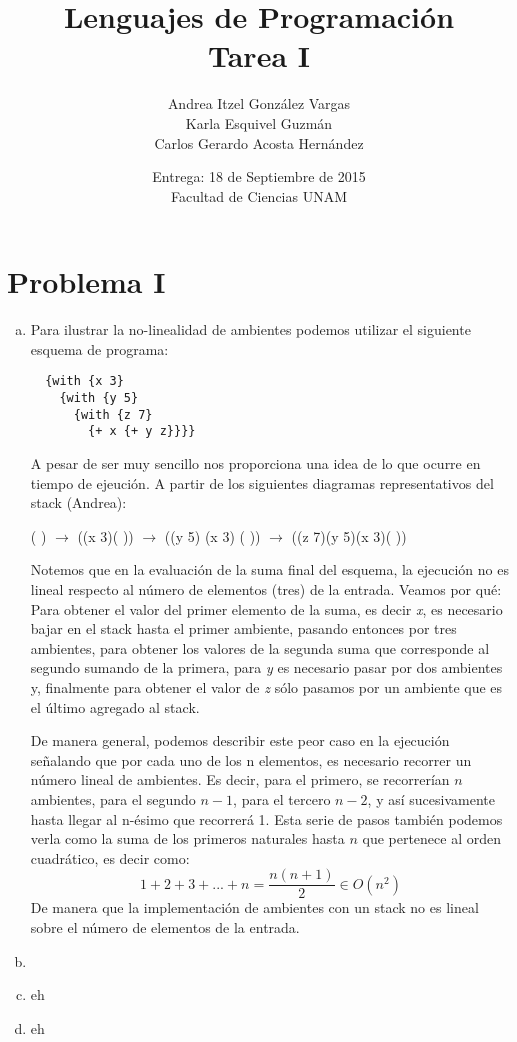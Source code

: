\documentclass[12pt]{article}
\title{Lenguajes de Programación \\ Tarea I}
\author{Andrea Itzel González Vargas \\ Karla Esquivel Guzmán \\ Carlos Gerardo Acosta Hernández}
\date{Entrega: 18 de Septiembre de 2015 \\ Facultad de Ciencias UNAM}
\begin{document}
\maketitle
\section{Problema I}
\begin{enumerate}[a)]
\item \indent Para ilustrar la no-linealidad de ambientes podemos utilizar el siguiente esquema de programa:
\begin{verbatim}
  {with {x 3}
    {with {y 5}
      {with {z 7}
        {+ x {+ y z}}}}
\end{verbatim}
A pesar de ser muy sencillo nos proporciona una idea de lo que ocurre en tiempo de ejeución. A partir de los siguientes diagramas representativos
del stack (Andrea):\par
( ) $\to$ ((x 3)( )) $\to$ ((y 5) (x 3) ( )) $\to$ ((z 7)(y 5)(x 3)( ))\par
\indent Notemos que en la evaluación de la suma final del esquema, la ejecución no es lineal respecto al número de elementos (tres) de la entrada.
Veamos por qué: Para obtener el valor del primer elemento de la suma, es decir \textit{x}, es necesario bajar en el stack hasta el primer ambiente,
pasando entonces por tres ambientes, para obtener los valores de la segunda suma que corresponde al segundo sumando de la primera, para \textit{y}
es necesario pasar por dos ambientes y, finalmente para obtener el valor de \textit{z} sólo pasamos por un ambiente que es el último agregado al
stack.\par
\indent De manera general, podemos describir este peor caso en la ejecución señalando que por cada uno de los n elementos, es necesario recorrer
un número lineal de ambientes. Es decir, para el primero, se recorrerían $n$ ambientes, para el segundo $n-1$, para el tercero $n-2$, y así sucesivamente hasta llegar al n-ésimo que recorrerá 1. Esta serie de pasos también podemos verla como la suma de los primeros naturales hasta $n$ que pertenece al orden cuadrático,
es decir como:
\begin{equation}
  1+2+3+...+n = \frac{n(n+1)}{2} \in O(n^2)
\end{equation}
De manera que la implementación de ambientes con un stack no es lineal sobre el número de elementos de la entrada.

\item 
\item eh
\item eh
\end{enumerate}
\end{document}

